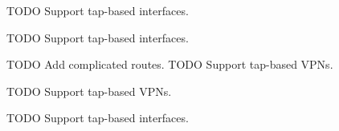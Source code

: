 
\begin{DoxyRefList}
\item[\label{todo__todo000001}%
\Hypertarget{todo__todo000001}%
Member \hyperlink{main_8c_a345bf2d3cf0cd82bcbbba3e054eafd48}{find\+\_\+primary\+\_\+if\+\_\+index} ()]T\+O\+DO Support tap-\/based interfaces. 
\item[\label{todo__todo000002}%
\Hypertarget{todo__todo000002}%
Member \hyperlink{main_8c_a6f5d8c51479e6196fb3d19e3538a46d0}{get\+\_\+if\+\_\+info} (struct ifaddrs $\ast$ifa, int family, enum I\+F\+\_\+\+T\+R\+A\+V\+E\+R\+S\+E\+\_\+\+M\+O\+DE tr\+\_\+mode)]T\+O\+DO Support tap-\/based interfaces. 
\item[\label{todo__todo000005}%
\Hypertarget{todo__todo000005}%
Member \hyperlink{main_8c_a25501fb2b3310a216de1ece7fa86e233}{get\+\_\+routes} ()]T\+O\+DO Add complicated routes. T\+O\+DO Support tap-\/based V\+P\+Ns. 
\item[\label{todo__todo000004}%
\Hypertarget{todo__todo000004}%
Member \hyperlink{main_8c_a9af8032bea78a008241c6a446021e90b}{public\+\_\+ip\+\_\+retrieve} ()]T\+O\+DO Support tap-\/based V\+P\+Ns. 
\item[\label{todo__todo000003}%
\Hypertarget{todo__todo000003}%
Member \hyperlink{main_8c_a5e3d195dba2da8b65b35a85c7834dfa2}{traverse\+\_\+ifs} (struct ifaddrs $\ast$ifaddr, enum I\+F\+\_\+\+T\+R\+A\+V\+E\+R\+S\+E\+\_\+\+M\+O\+DE tr\+\_\+mode)]T\+O\+DO Support tap-\/based interfaces.
\end{DoxyRefList}